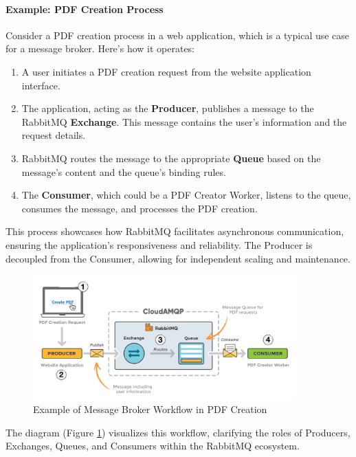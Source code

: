 \paragraph*{Example: PDF Creation Process}
Consider a PDF creation process in a web application, which is a typical use case for a message broker. Here’s how it operates:

\begin{enumerate}
    \item A user initiates a PDF creation request from the website application interface.
    \item The application, acting as the \textbf{Producer}, publishes a message to the RabbitMQ \textbf{Exchange}. This message contains the user’s information and the request details.
    \item RabbitMQ routes the message to the appropriate \textbf{Queue} based on the message's content and the queue's binding rules.
    \item The \textbf{Consumer}, which could be a PDF Creator Worker, listens to the queue, consumes the message, and processes the PDF creation.
\end{enumerate}

This process showcases how RabbitMQ facilitates asynchronous communication, ensuring the application’s responsiveness and reliability. The Producer is decoupled from the Consumer, allowing for independent scaling and maintenance.

\begin{figure}[H]
    \centering
    \includegraphics[width=0.9\textwidth]{src/assets/chapters/rabbitmqexample.png} %
    \caption{Example of Message Broker Workflow in PDF Creation}
    \label{fig:message_broker_workflow}
\end{figure}

The diagram (Figure \ref{fig:message_broker_workflow}) visualizes this workflow, clarifying the roles of Producers, Exchanges, Queues, and Consumers within the RabbitMQ ecosystem.

